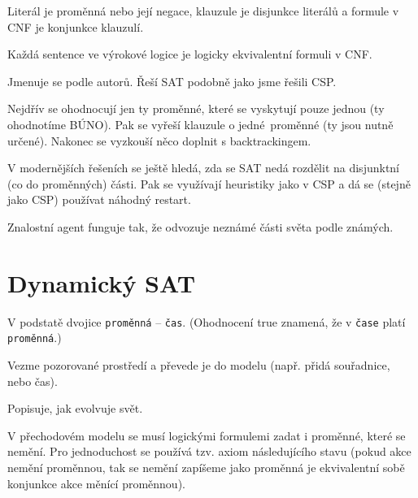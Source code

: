 \documentclass[12pt]{article}					%
\begin{document}

\begin{definice}
	Literál je proměnná nebo její negace, klauzule je disjunkce literálů a formule v CNF je konjunkce klauzulí.
\end{definice}

\begin{tvrzeni}[Z logiky]
	Každá sentence ve výrokové logice je logicky ekvivalentní formuli v CNF.
\end{tvrzeni}

\begin{definice}[DPLL]
	Jmenuje se podle autorů. Řeší SAT podobně jako jsme řešili CSP.

	Nejdřív se ohodnocují jen ty proměnné, které se vyskytují pouze jednou (ty ohodnotíme BÚNO). Pak se vyřeší klauzule o jedné proměnné (ty jsou nutně určené). Nakonec se vyzkouší něco doplnit s backtrackingem.

	V modernějších řešeních se ještě hledá, zda se SAT nedá rozdělit na disjunktní (co do proměnných) části. Pak se využívají heuristiky jako v CSP a dá se (stejně jako CSP) používat náhodný restart.
\end{definice}

\begin{definice}
	Znalostní agent funguje tak, že odvozuje neznámé části světa podle známých.
\end{definice}


\section{Dynamický SAT}
\begin{definice}[Fluent]
	V podstatě dvojice \verb|proměnná| – \verb|čas|. (Ohodnocení true znamená, že v \verb|čase| platí \verb|proměnná|.)
\end{definice}

\begin{definice}
	Vezme pozorované prostředí a převede je do modelu (např. přidá souřadnice, nebo čas).
\end{definice}

\begin{definice}
	Popisuje, jak evolvuje svět.
\end{definice}

\begin{definice}
	V přechodovém modelu se musí logickými formulemi zadat i proměnné, které se nemění. Pro jednoduchost se používá tzv. axiom následujícího stavu (pokud akce nemění proměnnou, tak se nemění zapíšeme jako proměnná je ekvivalentní sobě konjunkce akce měnící proměnnou).
\end{definice}
\end{document}
